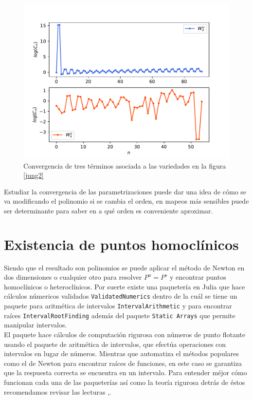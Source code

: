 \begin{figure}[H]
\centering
\includegraphics[scale=0.5]{convergenciaJungT57}
\caption{Convergencia de tres términos asociada a las variedades en la figura \ref{jung2}}
\label{convergenciaJ3}
\end{figure}

Estudiar la convergencia de las parametrizaciones puede dar una idea de cómo se va modificando el polinomio si se cambia el orden, en mapeos más sensibles puede ser determinante para saber en a qué orden es conveniente aproximar. 

\section{Existencia de puntos homoclínicos}

Siendo que el resultado son polinomios se puede aplicar el método de Newton en dos dimensiones o cualquier otro para resolver $P^{u}=P^{s}$ y encontrar puntos homoclínicos o heteroclínicos. Por suerte existe una paquetería en Julia que hace cálculos númericos validados \texttt{ValidatedNumerics}\cite{validated} dentro de la cuál se tiene un paquete para aritmética de intervalos \texttt{IntervalArithmetic}\citep{interval} y para encontrar raíces \texttt{IntervalRootFinding}\cite{root} además del paquete \texttt{Static Arrays}\cite{static} que permite manipular intervalos.\\ 

El paquete \cite{validated} hace cálculos de computación rigurosa con números de punto flotante usando el paquete de aritmética de intervalos, que efectúa operaciones con intervalos en lugar de números. Mientras que \cite{root} automatiza el métodos populares como el de Newton para encontrar raíces de funciones, en este caso se garantiza que la respuesta correcta se encuentra en un intervalo. Para entender méjor cómo funcionan cada una de las paqueterías así como la teoría rigurosa detrás de éstos recomendamos revisar las lecturas \cite{ramon},\cite{Numerics}. 

